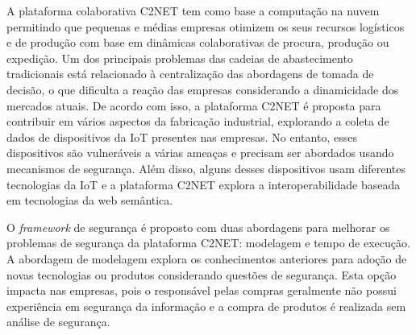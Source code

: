\documentclass[tid,table]{texufpel} %
\begin{document}
A plataforma colaborativa C2NET tem como base a computação na nuvem permitindo que pequenas e médias empresas otimizem os seus recursos logísticos e de produção com base em dinâmicas colaborativas de procura, produção ou expedição. Um dos principais problemas das cadeias de abastecimento tradicionais está relacionado à centralização das abordagens de tomada de decisão, o que dificulta a reação das empresas considerando a dinamicidade dos mercados atuais. De acordo com isso, a plataforma C2NET é proposta para contribuir em vários aspectos da fabricação industrial, explorando a coleta de dados de dispositivos da IoT presentes nas empresas. No entanto, esses dispositivos são vulneráveis a várias ameaças e precisam ser abordados usando mecanismos de segurança. Além disso, alguns desses dispositivos usam diferentes tecnologias da IoT e a plataforma C2NET explora a interoperabilidade baseada em tecnologias da web semântica.




O \textit{framework} de segurança é proposto com duas abordagens para melhorar os problemas de segurança da plataforma C2NET: modelagem e tempo de execução. A abordagem de modelagem explora os conhecimentos anteriores para adoção de novas tecnologias ou produtos considerando questões de segurança. Esta opção impacta nas empresas, pois o responsável pelas compras geralmente não possui experiência em segurança da informação e a compra de produtos é realizada sem análise de segurança.
\end{document}
